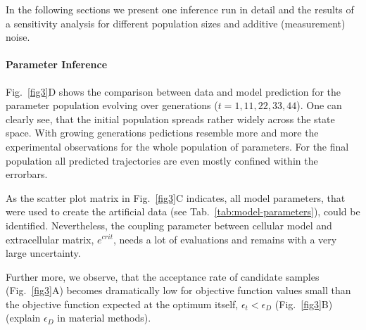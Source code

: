 \documentclass[10pt,letterpaper]{article}
\newcommand{\nj}[1]{{\color{blue}#1}}
\begin{document}
In the following sections we present one inference run in detail and the results of a sensitivity analysis for different population sizes and additive (measurement) noise. 

\paragraph{Parameter Inference}

Fig.~\ref{fig3}D shows the comparison between data and model prediction for the parameter population evolving over generations ($t=1,11,22,33,44$). One can clearly see, that the initial population spreads rather widely across the state space. With growing generations pedictions resemble more and more the experimental observations for the whole population of parameters. For the final population all predicted trajectories are even mostly confined within the errorbars.

As the scatter plot matrix in Fig.~\ref{fig3}C indicates, all model parameters, that were used to create the artificial data (see Tab.~\ref{tab:model-parameters}), could be identified. Nevertheless, the coupling parameter between cellular model and extracellular matrix, $e^{crit}$, needs a lot of evaluations and remains with a very large uncertainty. 

Further more, we observe, that the acceptance rate of candidate samples (Fig.~\ref{fig3}A) becomes dramatically low for objective function values small than the objective function expected at the optimum itself, $\epsilon_{t} < \epsilon_{D}$ (Fig.~\ref{fig3}B) \nj{(explain $\epsilon_{D}$ in material methods)}.
\end{document}
